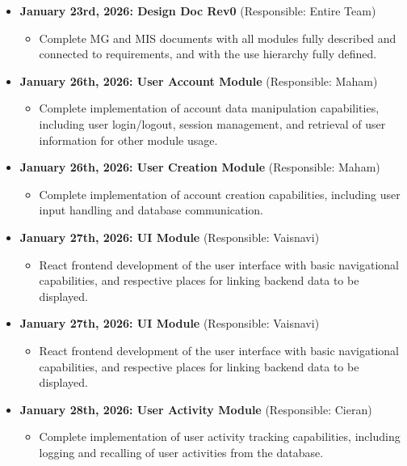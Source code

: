 \documentclass[12pt, titlepage]{article}
\begin{document}
\begin{itemize}
    \item \textbf{January 23rd, 2026: Design Doc Rev0} (Responsible: Entire Team)
    \begin{itemize}
        \item Complete MG and MIS documents with all modules fully described and connected to requirements, and with the use hierarchy fully defined.
    \end{itemize}

    \item \textbf{January 26th, 2026: User Account Module} (Responsible: Maham)
    \begin{itemize}
        \item Complete implementation of account data manipulation capabilities, including user login/logout, session management, and retrieval of user information for other module usage.
    \end{itemize}

    \item \textbf{January 26th, 2026: User Creation Module} (Responsible: Maham)
    \begin{itemize}
        \item Complete implementation of account creation capabilities, including user input handling and database communication.
    \end{itemize}

    \item \textbf{January 27th, 2026: UI Module} (Responsible: Vaisnavi)
    \begin{itemize}
        \item React frontend development of the user interface with basic navigational capabilities, and respective places for linking backend data to be displayed.
    \end{itemize}
    
    \item \textbf{January 27th, 2026: UI Module} (Responsible: Vaisnavi)
    \begin{itemize}
        \item React frontend development of the user interface with basic navigational capabilities, and respective places for linking backend data to be displayed.
    \end{itemize}

    \item \textbf{January 28th, 2026: User Activity Module} (Responsible: Cieran)
    \begin{itemize}
        \item Complete implementation of user activity tracking capabilities, including logging and recalling of user activities from the database.
    \end{itemize}


\end{itemize}
\end{document}

